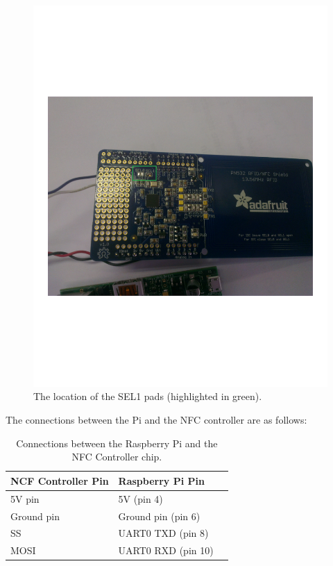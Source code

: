 \begin{figure}
 \centering 
 \includegraphics[clip=true, trim = 0 250 0 270,
 scale=0.7]{soldeer_pic}
 \caption{The location of the SEL1 pads (highlighted in green).}
 \label{fig:nfc-chip-solder}
\end{figure}

The connections between the Pi and the NFC controller are as follows: 

\begin{table}
\centering
 \caption{Connections between the Raspberry Pi and the NFC Controller chip.}
 \begin{tabular}{|l|l|l|}
  \hline
  \textbf{NCF Controller Pin} & \textbf{Raspberry Pi Pin}\\\hline\hline
  5V pin & 5V (pin 4) \\\hline
  Ground pin & Ground pin (pin 6) \\\hline
  SS & UART0 TXD (pin 8) \\\hline
  MOSI & UART0 RXD (pin 10) \\\hline
 \end{tabular}
\end{table}


